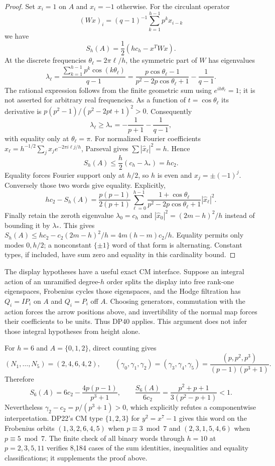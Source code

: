 \begin{proof}
Set $x_i=1$ on $A$ and $x_i=-1$ otherwise. For the circulant operator
\[
 (Wx)_i=(q-1)^{-1}\sum_{k=1}^{h-1}p^kx_{i-k}
\]
we have
\[
 S_h(A)=\frac12(hc_h-x^TWx).
\]
At the discrete frequencies $\theta_\ell=2\pi\ell/h$, the symmetric part of $W$ has eigenvalues
\[
 \lambda_\ell=\frac{\sum_{k=1}^{h-1}p^k\cos(k\theta_\ell)}{q-1}
 =\frac{p\cos\theta_\ell-1}{p^2-2p\cos\theta_\ell+1}
       -\frac1{q-1}.
\]
The rational expression follows from the finite geometric sum using
$e^{ih\theta_\ell}=1$; it is not asserted for arbitrary real frequencies.
As a function of $t=\cos\theta_\ell$ its derivative is
$p(p^2-1)/(p^2-2pt+1)^2>0$. Consequently
\[
 \lambda_\ell\ge\lambda_*=-\frac1{p+1}-\frac1{q-1},
\]
with equality only at $\theta_\ell=\pi$. For normalized Fourier coefficients
$\widehat x_\ell=h^{-1/2}\sum_jx_je^{-2\pi i\ell j/h}$, Parseval gives
$\sum|\widehat x_\ell|^2=h$. Hence
\[
 S_h(A)\le\frac h2(c_h-\lambda_*)=hc_2.
\]
Equality forces Fourier support only at $h/2$, so $h$ is even and
$x_j=\pm(-1)^j$. Conversely those two words give equality. Explicitly,
\[
 hc_2-S_h(A)=\frac{p(p-1)}{2(p+1)}
 \sum_{\ell=0}^{h-1}
 \frac{1+\cos\theta_\ell}{p^2-2p\cos\theta_\ell+1}
 |\widehat x_\ell|^2.
\]
Finally retain the zeroth eigenvalue $\lambda_0=c_h$ and
$|\widehat x_0|^2=(2m-h)^2/h$ instead of bounding it by $\lambda_*$. This gives
$S_h(A)\le hc_2-c_2(2m-h)^2/h=4m(h-m)c_2/h$.
Equality permits only modes $0,h/2$; a nonconstant $\{\pm1\}$ word of that form is alternating. Constant types, if included, have sum zero and equality in this cardinality bound.
\end{proof}

The display hypotheses have a useful exact CM interface. Suppose an integral action of an unramified degree-$h$ order splits the display into free rank-one eigenspaces, Frobenius cycles those eigenspaces, and the Hodge filtration has $Q_i=IP_i$ on $A$ and $Q_i=P_i$ off $A$. Choosing generators, commutation with the action forces the arrow positions above, and invertibility of the normal map forces their coefficients to be units. Thus DP40 applies. This argument does not infer those integral hypotheses from height alone.

For $h=6$ and $A=\{0,1,2\}$, direct counting gives
\[
 (N_1,\ldots,N_5)=(2,4,6,4,2),\qquad
 (\gamma_0,\gamma_1,\gamma_2)
 =(\gamma_3,\gamma_4,\gamma_5)
 =\frac{(p,p^2,p^3)}{(p-1)(p^3+1)}.
\]
Therefore
\[
 S_6(A)=6c_2-\frac{4p(p-1)}{p^3+1},\qquad
 \frac{S_6(A)}{6c_2}=\frac{p^2+p+1}{3(p^2-p+1)}<1.
\]
Nevertheless $\gamma_2-c_2=p/(p^3+1)>0$, which explicitly refutes a componentwise interpretation. DP22's CM type $\{1,2,3\}$ for $y^2=x^7-1$ gives this word on the Frobenius orbits
$(1,3,2,6,4,5)$ when $p\equiv3\bmod7$ and
$(2,3,1,5,4,6)$ when $p\equiv5\bmod7$.
The finite check of all binary words through $h=10$ at $p=2,3,5,11$ verifies 8,184 cases of the sum identities, inequalities and equality classifications; it supplements the proof above.

